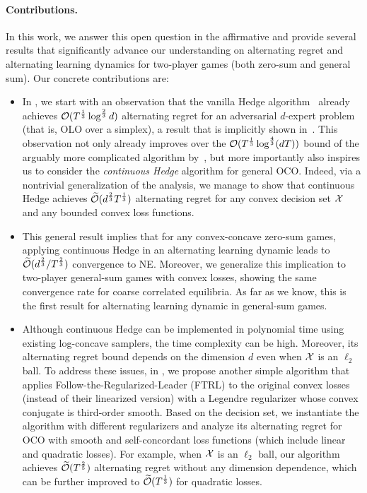 \paragraph{Contributions.} In this work, we answer this open question in the affirmative and provide several results that significantly advance our understanding on alternating regret and alternating learning dynamics for two-player games (both zero-sum and general sum).
Our concrete contributions are:
\begin{itemize}[leftmargin=*]
    \item In , we start with an observation that the vanilla Hedge algorithm~\citep{freund1997decision} already achieves $\mathcal{O}(T^\frac{1}{3}\log^{\frac{2}{3}}d)$ alternating regret for an adversarial $d$-expert problem (that is, OLO over a simplex), a result that is implicitly shown in~\citet{wibisono2022alternating}.
    This observation not only already improves over the $\mathcal{O}(T^\frac{1}{3}\log^{\frac{4}{3}}(dT))$ bound of the arguably more complicated algorithm by~\citet{cevher2024alternation},
    but more importantly also inspires us to consider the \emph{continuous Hedge} algorithm for general OCO. 
    Indeed, via a nontrivial generalization of the analysis, we manage to show that continuous Hedge achieves $\widetilde{\mathcal{O}}(d^{\frac{2}{3}}T^\frac{1}{3})$ alternating regret for any convex decision set ${\mathcal{X}}$ and any bounded convex loss functions.

    \item This general result implies that for any convex-concave zero-sum games, applying continuous Hedge in an alternating learning dynamic leads to $\widetilde{\mathcal{O}}(d^{\frac{2}{3}}/T^{\frac{2}{3}})$ convergence to NE.
    Moreover, we generalize this implication to two-player general-sum games with convex losses, showing the same convergence rate for coarse correlated equilibria.
    As far as we know, this is the first result for alternating learning dynamic in general-sum games.

    \item Although continuous Hedge can be implemented in polynomial time using existing log-concave samplers, the time complexity can be high.
    Moreover, its alternating regret bound depends on the dimension $d$ even when ${\mathcal{X}}$ is an $\ell_2$ ball.
    To address these issues, in , we propose another simple algorithm that applies
    Follow-the-Regularized-Leader (FTRL) to the original convex losses (instead of their linearized version) with a Legendre regularizer whose convex conjugate is third-order smooth.
    Based on the decision set, we instantiate the algorithm with different regularizers and analyze its alternating regret for OCO with smooth and self-concordant loss functions (which include linear and quadratic losses).
    For example, when ${\mathcal{X}}$ is an $\ell_2$ ball, our algorithm achieves $\widetilde{\mathcal{O}}(T^\frac{2}{5})$ alternating regret without any dimension dependence, which can be further improved to $\widetilde{\mathcal{O}}(T^{\frac{1}{3}})$ for quadratic losses.
    

\end{itemize}
